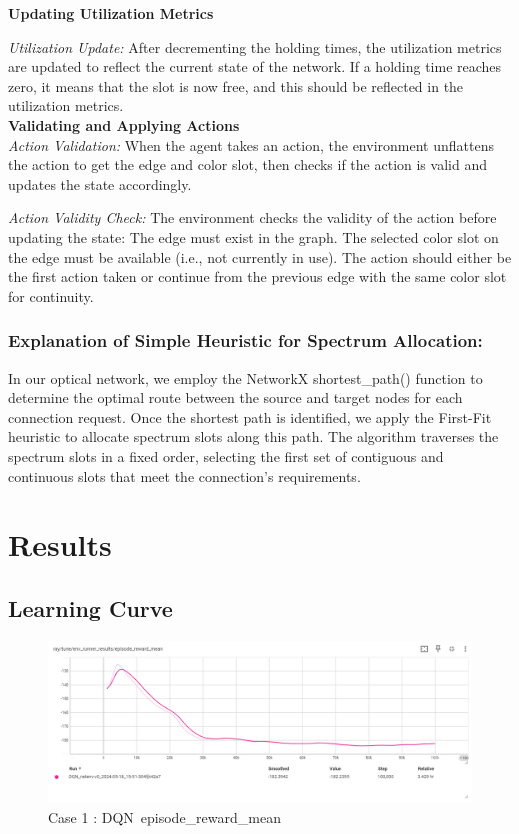 \documentclass[conference]{IEEEtran}
\begin{document}
\noindent\textbf{Updating Utilization Metrics}

\textit{Utilization Update:} After decrementing the holding times, the utilization metrics are updated to reflect the current state of the network. If a holding time reaches zero, it means that the slot is now free, and this should be reflected in the utilization metrics.\\

\noindent\textbf{Validating and Applying Actions}\\
\textit{Action Validation:} When the agent takes an action, the environment unflattens the action to get the edge and color slot, then checks if the action is valid and updates the state accordingly.

\textit{Action Validity Check:} The environment checks the validity of the action before updating the state:
The edge must exist in the graph.
The selected color slot on the edge must be available (i.e., not currently in use).
The action should either be the first action taken or continue from the previous edge with the same color slot for continuity.
\\

\subsubsection{\textbf{Explanation of Simple Heuristic for Spectrum Allocation:}}

In our optical network, we employ the NetworkX shortest\_path() function to determine the optimal route between the source and target nodes for each connection request. Once the shortest path is identified, we apply the First-Fit heuristic to allocate spectrum slots along this path. The algorithm traverses the spectrum slots in a fixed order, selecting the first set of contiguous and continuous slots that meet the connection's requirements. 

\section{\textbf{Results}}

\subsection{\textbf{Learning Curve}}


\begin{figure}[H]
    \centering
    \includegraphics[width=0.5\linewidth]{dqn_fixed_reward.png}
    \caption{Case 1 : DQN\ episode\_reward\_mean}
    \label{fig:enter-label}
\end{figure}
\end{document}
